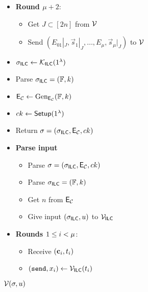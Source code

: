 \begin{figure}[!h]
{\begin{minipage}[t]{13cm}
\begin{algorithm}[H]
\begin{itemize}
\item \textbf{Round $\mu+2$}: 

\begin{itemize}
\item Get $J\subset [2n]$ from $\mathcal{V}$
\item Send $(E_{01}|_J,\vec{s}_1|_J,\ldots,E_\mu,\vec{s}_\mu|_J)$
to $\mathcal{V}$
\end{itemize}

\end{itemize} 
\vspace{2.47cm}
\end{algorithm}
\end{minipage}%
\begin{minipage}[t]{6.5cm}
\vspace{0cm}
\begin{algorithm}[H]
\caption*{$\KK(1^\sep)$\vspace{-1pt}}
\begin{itemize}
\item $\mathsf{\sigma}_{\mathsf{ILC}}\gets \mathcal{K}_{\mathsf{ILC}}(1^{\lambda})$
\item Parse $\mathsf{\sigma}_{\mathsf{ILC}}=(\mathbb{F},k)$
\item $\mathsf{E}_{\mathcal{C}}\gets {\text{Gen}}_{\mathsf{E}_{\mathcal{C}}}(\mathbb{F},k)$
\item $ck\gets \mathsf{Setup}(1^{\lambda})$
\item Return $\mathsf{\sigma}=(\mathsf{\sigma}_{\mathsf{ILC}},\mathsf{E}_{\mathcal{C}},ck)$
\end{itemize}
\end{algorithm}
\vspace{-30pt}
\begin{algorithm}[H]
\caption*{$\mathcal{V}(\mathsf{\sigma}, u)$}
\begin{itemize} \item \textbf{Parse input} 
\begin{itemize}
\item Parse $\mathsf{\sigma}=(\mathsf{\sigma}_{\mathsf{ILC}},\mathsf{E}_{\mathcal{C}},ck)$
\item Parse $\mathsf{\sigma}_{\mathsf{ILC}}=(\mathbb{F},k)$
\item Get $n$ from $\mathsf{E}_{\mathcal{C}}$
\item Give input $(\mathsf{\sigma}_{\mathsf{ILC}},u)$ to $\mathcal{V}_{\mathsf{ILC}}$
\end{itemize}
\item \textbf{Rounds $1 \leq i < \mu$}:
\begin{itemize}
\item Receive $(\mathbf{c}_i,t_i)$
\item $(\texttt{send},x_i)\gets \mathcal{V}_{\mathsf{ILC}}(t_i)$

\end{itemize}
\end{itemize}
\end{algorithm}
\end{minipage}}
\end{figure}
